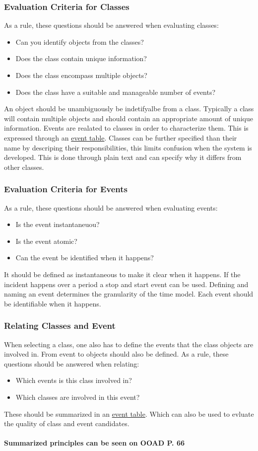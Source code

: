 \subsubsection*{Evaluation Criteria for Classes \ooad[63]}
As a rule, these questions should be answered when evaluating classes:
\begin{itemize}
    \item Can you identify objects from the classes?
    \item Does the class contain unique information?
    \item Does the class encompass multiple objects?
    \item Does the class have a suitable and manageable number of events?
\end{itemize}
An object should be unambiguously be indetifyalbe from a class. Typically a class will contain multiple objects and should contain an appropriate amount of unique information. Events are realated to classes in order to characterize them. This is expressed through an  \hyperref[fig:event_table]{event table}. Classes can be further specified than their name by descriping their responsibilities, this limits confusion when the system is developed. This is done through plain text and can specify why it differs from other classes.

\subsubsection*{Evaluation Criteria for Events \ooad[65]}
As a rule, these questions should be answered when evaluating events:
\begin{itemize}
    \item Is the event instantaneuou?
    \item Is the event atomic?
    \item Can the event be identified when it happens?
\end{itemize}
It should be defined as instantaneous to make it clear when it happens. If the incident happens over a period a stop and start event can be used. Defining and naming an event determines the granularity of the time model. Each event should be identifiable when it happens.

\subsubsection*{Relating Classes and Event \ooad[66]}
When selecting a class, one also has to define the events that the class objects are involved in. From event to objects should also be defined.
As a rule, these questions should be answered when relating:
\begin{itemize}
    \item Which events is this class involved in?
    \item Which classes are involved in this event?
\end{itemize}
These should be summarized in an \hyperref[fig:event_table]{event table}. Which can also be used to evluate the quality of class and event candidates.
\\\\
{\Large \textbf{Summarized principles can be seen on OOAD P. 66}}